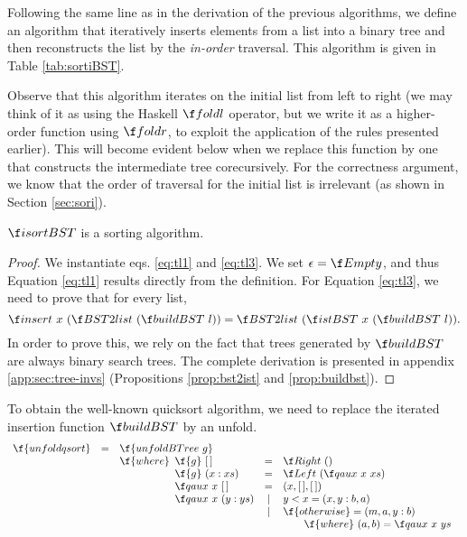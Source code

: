 \documentclass[a4paper,11pt]{llncs}
\begin{document}
Following the same line as in the derivation of the previous
algorithms, we define an algorithm that iteratively inserts elements
from a list into a binary tree and then reconstructs the list by the
\emph{in-order} traversal.  This algorithm is given in Table
\ref{tab:sortiBST}.

Observe that this algorithm iterates on the initial list from left to
right (we may think of it as using the Haskell $\foldl$ operator, but
we write it as a higher-order function using $\foldr$, to exploit the
application of the rules presented earlier). This will become evident
below when we replace this function by one that constructs the
intermediate tree corecursively. For the correctness argument, we know
that the order of traversal for the initial list is irrelevant (as
shown in Section \ref{sec:sori}).

\begin{proposition}
  $\isortBST$ is a sorting algorithm.  
\end{proposition}
\begin{proof}
  We instantiate eqs. \ref{eq:tl1} and \ref{eq:tl3}. We set $\epsilon
  = \Empty$, and thus Equation \ref{eq:tl1} results directly from the
  definition. For Equation \ref{eq:tl3}, we need to prove that for
  every list,
  \[ \insert\ x\ (\BST2list\ (\buildBST\ l)) = \BST2list\ (\istBST\ x
  \ (\buildBST\ l)). \] In order to prove this, we rely on the fact
  that trees generated by $\buildBST$ are always binary search
  trees. The complete derivation is presented in appendix
  \ref{app:sec:tree-invs} (Propositions \ref{prop:bst2ist} and
  \ref{prop:buildbst}).
\end{proof}  


To obtain the well-known quicksort algorithm, we need to replace the
iterated insertion function $\buildBST$ by an unfold.
\[
\begin{array}{lcl}
  \f{unfoldqsort} & = & \f{unfoldBTree\ g}\\
  && \f{where} 
             \begin{array}[t]{lcl}
               \f{g}\ \Nil  & = & \Right\ () \\
               \f{g}\ (x:xs) & = &\Left\ (\qaux\ x\ xs)\\
               \qaux\ x\ \Nil  & = & (x,\Nil,\Nil) \\
               \qaux\ x\ (y:ys)  & | & y<x = (x,y:b,a) \\
               & | & \f{otherwise} = (m,a,y:b) \\
               && \qquad\f{where}\ (a,b) = \qaux\ x\ ys
             \end{array} \\
\end{array}
\]
\end{document}
